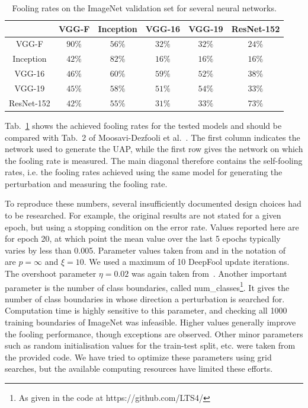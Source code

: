 \documentclass[runningheads]{llncs}
\begin{document}
\begin{table}[htbp]
\centering
\caption{Fooling rates on the ImageNet validation set for several neural networks.}
\begin{tabular}{|c|c|c|c|c|c|}
\hline

			& VGG-F		&	Inception	&	VGG-16		&	VGG-19		&	ResNet-152	\\ \hline
VGG-F		& $90\%$	&	$56\%$		&	$32\%$		&	$32\%$		& 	$24\%$		\\
Inception	& $42\%$	&	$82\%$		&	$16\%$		&	$16\%$		& 	$16\%$	\\
VGG-16		& $46\%$	&	$60\%$		&	$59\%$		&	$52\%$		& 	$38\%$	\\
VGG-19		& $45\%$	&	$58\%$		&	$51\%$		&	$54\%$		& 	$33\%$	\\
ResNet-152	& $42\%$	&	$55\%$		&	$31\%$		&	$33\%$		& 	$73\%$	\\
\hline 
\end{tabular}
\label{tbl_stoerraten_reprod_kreuz_linf}
\end{table}

Tab.~\ref{tbl_stoerraten_reprod_kreuz_linf} shows the achieved fooling rates for the tested models and should be compared with Tab.~2 of Moosavi-Dezfooli et al.~\cite{moosavidezfooli_universal_2017}. The first column indicates the network used to generate the UAP, while the first row gives the network on which the fooling rate is measured. The main diagonal therefore contains the self-fooling rates, i.e. the fooling rates achieved using the same model for generating the perturbation and measuring the fooling rate. 

To reproduce these numbers, several insufficiently documented design choices had to be researched. For example, the original results are not stated for a given epoch, but using a stopping condition on the error rate. Values reported here are for epoch 20, at which point the mean value over the last 5 epochs typically varies by less than 0.005. Parameter values taken from and in the notation of~\cite{moosavi-dezfooli_deepfool_2016} are \(p=\infty\) and \(\xi=10\). We used a maximum of 10 DeepFool update iterations. The overshoot parameter \(\eta=0.02\) was again taken from~\cite{moosavi-dezfooli_deepfool_2016}. 
Another important parameter is the number of class boundaries, called num\_classes\footnote{As given in the code at https://github.com/LTS4/}. It gives the number of class boundaries in whose direction a perturbation is searched for. Computation time is highly sensitive to this parameter, and checking all 1000 training boundaries of ImageNet was infeasible. Higher values generally improve the fooling performance, though exceptions are observed. 
Other minor parameters such as random initialisation values for the train-test split, etc. were taken from the provided code. We have tried to optimize these parameters using grid searches, but the available computing resources have limited these efforts. 
\end{document}
